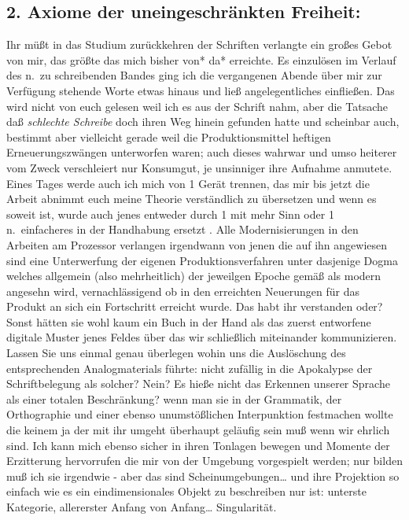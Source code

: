 \documentclass[
]{article}
\author{}
\date{\vspace{-2.5em}}
\begin{document}
\subsection{2. Axiome der uneingeschränkten
Freiheit:}\label{axiome-der-uneingeschruxe4nkten-freiheit}

Ihr müßt in das Studium zurückkehren der Schriften verlangte ein großes
Gebot von mir, das größte das mich bisher von* da* erreichte. Es
einzulösen im Verlauf des n.~zu schreibenden Bandes ging ich die
vergangenen Abende über mir zur Verfügung stehende Worte etwas hinaus
und ließ angelegentliches einfließen. Das wird nicht von euch gelesen
weil ich es aus der Schrift nahm, aber die Tatsache daß \emph{schlechte
Schreibe} doch ihren Weg hinein gefunden hatte und scheinbar auch,
bestimmt aber vielleicht gerade weil die Produktionsmittel heftigen
Erneuerungszwängen unterworfen waren; auch dieses wahrwar und umso
heiterer vom Zweck verschleiert nur Konsumgut, je unsinniger ihre
Aufnahme anmutete. Eines Tages werde auch ich mich von 1 Gerät trennen,
das mir bis jetzt die Arbeit abnimmt euch meine Theorie verständlich zu
übersetzen und wenn es soweit ist, wurde auch jenes entweder durch 1 mit
mehr Sinn oder 1 n.~einfacheres in der Handhabung ersetzt . Alle
Modernisierungen in den Arbeiten am Prozessor verlangen irgendwann von
jenen die auf ihn angewiesen sind eine Unterwerfung der eigenen
Produktionsverfahren unter dasjenige Dogma welches allgemein (also
mehrheitlich) der jeweilgen Epoche gemäß als modern angesehn wird,
vernachlässigend ob in den erreichten Neuerungen für das Produkt an sich
ein Fortschritt erreicht wurde. Das habt ihr verstanden oder? Sonst
hätten sie wohl kaum ein Buch in der Hand als das zuerst entworfene
digitale Muster jenes Feldes über das wir schließlich miteinander
kommunizieren. Lassen Sie uns einmal genau überlegen wohin uns die
Auslöschung des entsprechenden Analogmaterials führte: nicht zufällig in
die Apokalypse der Schriftbelegung als solcher? Nein? Es hieße nicht das
Erkennen unserer Sprache als einer totalen Beschränkung? wenn man sie in
der Grammatik, der Orthographie und einer ebenso unumstößlichen
Interpunktion festmachen wollte die keinem ja der mit ihr umgeht
überhaupt geläufig sein muß wenn wir ehrlich sind. Ich kann mich ebenso
sicher in ihren Tonlagen bewegen und Momente der Erzitterung hervorrufen
die mir von der Umgebung vorgespielt werden; nur bilden muß ich sie
irgendwie - aber das sind Scheinumgebungen\ldots{} und ihre Projektion
so einfach wie es ein eindimensionales Objekt zu beschreiben nur ist:
unterste Kategorie, allererster Anfang von Anfang\ldots{} Singularität.
\end{document}
